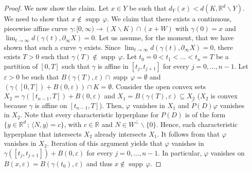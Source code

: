 \documentclass[12pt]{amsart}
\newcommand{\R}{\mathbb{R}}
\newcommand{\supp}{\operatorname{supp}\,}
\theoremstyle{definition}
\theoremstyle{remark}
\numberwithin{equation}{section}
\begin{document}
\begin{proof}
We now show the claim. Let $x \in Y$ be such that  $d_Y(x)<d(K,\R^d\backslash Y)$. We need to show that $x \notin \supp \varphi$.  We claim that there exists a continuous, piecewise affine curve $\gamma:[0,\infty)\rightarrow \left(X\backslash K\right)\cap(x+W)$ with $\gamma(0)=x$ and  $\lim_{t\rightarrow\infty}d(\gamma(t),\partial_\infty X)=0$.  Let us assume, for the moment, that we have shown that  such a curve $\gamma$ exists. Since $\lim_{t\rightarrow\infty}d(\gamma(t),\partial_\infty X)=0$, there exists $T > 0$ such that $\gamma(T)\notin\supp\varphi$. Let $t_0=0<t_1<\ldots<t_n=T$ be a partition of $[0,T]$ such that $\gamma$ is affine in $[t_j,t_{j+1}]$ for every $j=0,\ldots,n-1$. Let $\varepsilon>0$ be such that $B(\gamma(T),\varepsilon) \cap \supp\varphi = \emptyset$ and $\left(\gamma([0,T])+B(0,\varepsilon)\right) \cap K= \emptyset$. Consider the open convex sets $X_2=\gamma([t_{n-1},T])+B(0,\varepsilon)$ and $X_1=B(\gamma(T),\varepsilon)\subseteq X_2$ ($X_2$ is convex because $\gamma $ is affine on $[t_{n-1},T]$). Then, $\varphi$ vanishes in $X_1$ and  $\check{P}(D)\varphi$ vanishes in $X_2$. Note that every characteristic hyperplane for $P(D)$ is of the form $\{y\in\R^d \, ; \, \langle N, y \rangle =c \}$, with $c \in\R$ and $N \in W^\perp \backslash \{0\}$. Hence, each characteristic hyperplane that intersects $X_2$ already intersects $X_1$. It follows from \cite[Theorem 8.6.8]{HoermanderPDO1} that $\varphi$ vanishes in $X_2$. Iteration of this argument yields that $\varphi$ vanishes in $\gamma([t_j,t_{j+1}])+B(0,\varepsilon)$ for every $j=0,\ldots, n-1$. In particular, $\varphi$ vanishes on $B(x, \varepsilon) = B(\gamma(t_0), \varepsilon)$  and thus $x \notin \supp \varphi$.
	

\end{proof}
\end{document}
